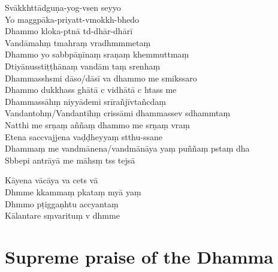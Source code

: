 Svākkhttādguṇa-yog-vsen seyyo\\
Yo maggpāka-priyatt-vmokkh-bhedo\\
Dhammo kloka-ptnā td-dhār-dhārī\\
Vandāmahṃ tmahraṃ vradhmmmetaṃ\\
Dhammo yo sabbpāṇīnaṃ sraṇaṃ khemmuttmaṃ\\
Dtiyānusstiṭṭhānaṃ vandām taṃ srenhaṃ\\
Dhammasshsmi dāso/dāsī va dhammo me smikssaro\\
Dhammo dukkhass ghātā c vidhātā c htass me\\
Dhammassāhṃ niyyādemi srīrañjīvtañcdaṃ\\
Vandantohṃ/Vandantīhṃ crissāmi dhammassev sdhammtaṃ\\
Natthi me srṇaṃ aññaṃ dhammo me srṇaṃ vraṃ\\
Etena saccvajjena vaḍḍheyyaṃ stthu-ssane\\
Dhammaṃ me vandmānena/vandmānāya yaṃ puññaṃ pstaṃ dha\\
Sbbepi antrāyā me māhsṃ tss tejsā


Kāyena vācāya va cets vā\\
Dhmme kkammaṃ pkataṃ myā yaṃ\\
Dhmmo pṭiggaṇhtu accyantaṃ\\
Kālantare sṃvarituṃ v dhmme

\chapter{Supreme praise of the Dhamma}

\begin{leader}
\end{leader}

